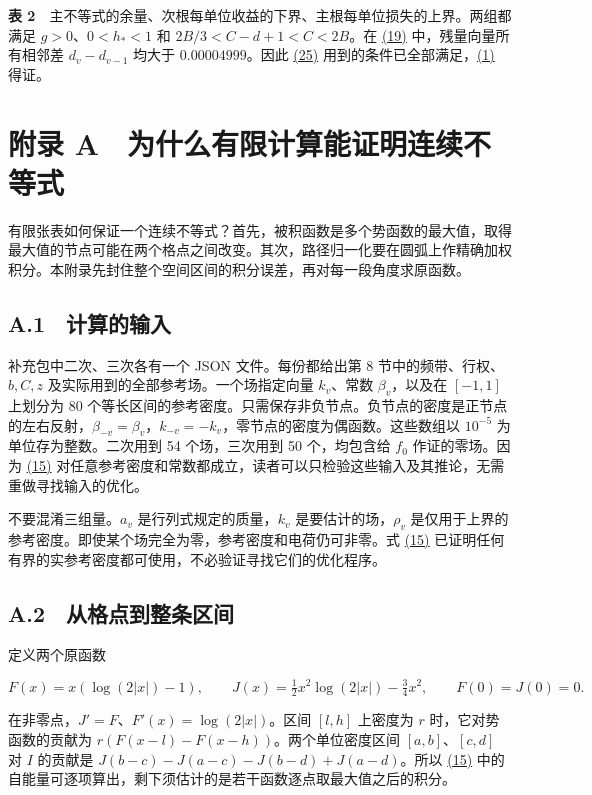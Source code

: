 \documentclass[11pt,a4paper]{article}
\begin{document}
\textbf{表 2}　主不等式的余量、次根每单位收益的下界、主根每单位损失的上界。两组都满足 \(g>0\)、\(0<h_*<1\) 和 \(2B/3<C-d+1<C<2B\)。在 \hyperref[eq:19]{(19)} 中，残量向量所有相邻差 \(d_v-d_{v-1}\) 均大于 \(0.00004999\)。因此 \hyperref[eq:25]{(25)} 用到的条件已全部满足，\hyperref[eq:1]{(1)} 得证。

\section{附录 A　为什么有限计算能证明连续不等式}\label{ux9644ux5f55-a-ux4e3aux4ec0ux4e48ux6709ux9650ux8ba1ux7b97ux80fdux8bc1ux660eux8fdeux7eedux4e0dux7b49ux5f0f}

有限张表如何保证一个连续不等式？首先，被积函数是多个势函数的最大值，取得最大值的节点可能在两个格点之间改变。其次，路径归一化要在圆弧上作精确加权积分。本附录先封住整个空间区间的积分误差，再对每一段角度求原函数。

\subsection{A.1　计算的输入}\label{a.1-ux8ba1ux7b97ux7684ux8f93ux5165}

补充包中二次、三次各有一个 JSON 文件。每份都给出第 8 节中的频带、行权、\(b,C,z\) 及实际用到的全部参考场。一个场指定向量 \(k_v\)、常数 \(\beta_v\)，以及在 \([-1,1]\) 上划分为 80 个等长区间的参考密度。只需保存非负节点。负节点的密度是正节点的左右反射，\(\beta_{-v}=\beta_v\)，\(k_{-v}=-k_v\)，零节点的密度为偶函数。这些数组以 \(10^{-5}\) 为单位存为整数。二次用到 54 个场，三次用到 50 个，均包含给 \(f_0\) 作证的零场。因为 \hyperref[eq:15]{(15)} 对任意参考密度和常数都成立，读者可以只检验这些输入及其推论，无需重做寻找输入的优化。

不要混淆三组量。\(a_v\) 是行列式规定的质量，\(k_v\) 是要估计的场，\(\rho_v\) 是仅用于上界的参考密度。即使某个场完全为零，参考密度和电荷仍可非零。式 \hyperref[eq:15]{(15)} 已证明任何有界的实参考密度都可使用，不必验证寻找它们的优化程序。

\subsection{A.2　从格点到整条区间}\label{a.2-ux4eceux683cux70b9ux5230ux6574ux6761ux533aux95f4}

定义两个原函数

\[
 F(x)=x(\log(2|x|)-1),\qquad J(x)=\tfrac12x^2\log(2|x|)-\tfrac34x^2,
 \qquad F(0)=J(0)=0 .
\]

在非零点，\(J'=F\)、\(F'(x)=\log(2|x|)\)。区间 \([l,h]\) 上密度为 \(r\) 时，它对势函数的贡献为 \(r(F(x-l)-F(x-h))\)。两个单位密度区间 \([a,b]\)、\([c,d]\) 对 \(I\) 的贡献是 \(J(b-c)-J(a-c)-J(b-d)+J(a-d)\)。所以 \hyperref[eq:15]{(15)} 中的自能量可逐项算出，剩下须估计的是若干函数逐点取最大值之后的积分。
\end{document}
